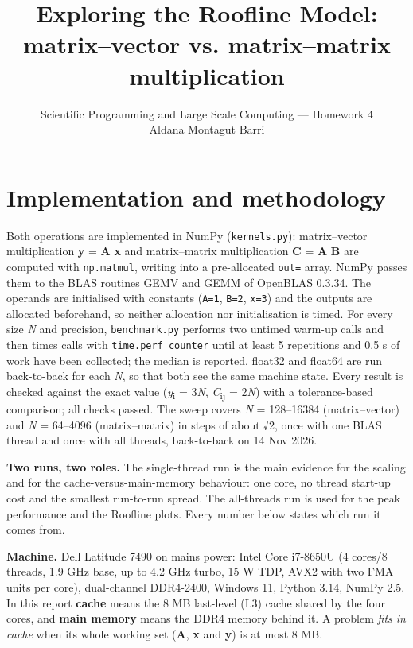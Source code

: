 \documentclass[10pt,a4paper]{article}
\title{\vspace{-1.4cm}Exploring the Roofline Model: matrix–vector vs. matrix–matrix multiplication\vspace{-0.3cm}}
\author{Scientific Programming and Large Scale Computing — Homework 4 \\ \small Aldana Montagut Barri}
\date{\vspace{-0.6cm}}
\begin{document}
\maketitle

\section{Implementation and methodology}
Both operations are implemented in NumPy (\texttt{kernels.py}): matrix–vector multiplication \textbf{y} = \textbf{A} \textbf{x} and matrix–matrix multiplication \textbf{C} = \textbf{A} \textbf{B} are computed with \texttt{np.matmul}, writing into a pre-allocated \texttt{out=} array. NumPy passes them to the BLAS routines GEMV and GEMM of OpenBLAS 0.3.34. The operands are initialised with constants (\texttt{A=1}, \texttt{B=2}, \texttt{x=3}) and the outputs are allocated beforehand, so neither allocation nor initialisation is timed. For every size \emph{N} and precision, \texttt{benchmark.py} performs two untimed warm-up calls and then times calls with \texttt{time.perf\_counter} until at least 5 repetitions and 0.5 s of work have been collected; the median is reported. float32 and float64 are run back-to-back for each \emph{N}, so that both see the same machine state. Every result is checked against the exact value (\emph{y}\textsubscript{i} = 3\emph{N}, \emph{C}\textsubscript{ij} = 2\emph{N}) with a tolerance-based comparison; all checks passed. The sweep covers \emph{N} = 128–16384 (matrix–vector) and \emph{N} = 64–4096 (matrix–matrix) in steps of about √2, once with one BLAS thread and once with all threads, back-to-back on 14 Nov 2026.

\textbf{Two runs, two roles.} The single-thread run is the main evidence for the scaling and for the cache-versus-main-memory behaviour: one core, no thread start-up cost and the smallest run-to-run spread. The all-threads run is used for the peak performance and the Roofline plots. Every number below states which run it comes from.

\textbf{Machine.} Dell Latitude 7490 on mains power: Intel Core i7-8650U (4 cores/8 threads, 1.9 GHz base, up to 4.2 GHz turbo, 15 W TDP, AVX2 with two FMA units per core), dual-channel DDR4-2400, Windows 11, Python 3.14, NumPy 2.5. In this report \textbf{cache} means the 8 MB last-level (L3) cache shared by the four cores, and \textbf{main memory} means the DDR4 memory behind it. A problem \emph{fits in cache} when its whole working set (\textbf{A}, \textbf{x} and \textbf{y}) is at most 8 MB.
\end{document}
